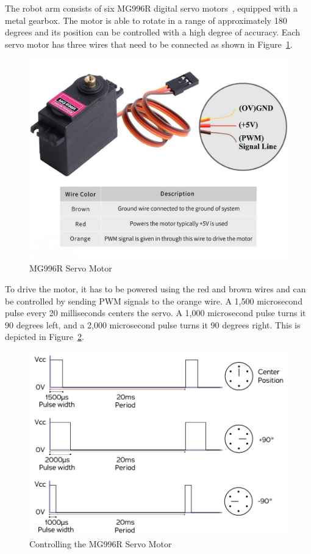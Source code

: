 \documentclass[MMR,Master,english]{style/twbook}
\begin{document}
\noindent The robot arm consists of six MG996R digital servo motors~\cite{MG996RServoMotor}, equipped with a metal gearbox. The motor is able to rotate in a range of approximately 180 degrees and its position can be controlled with a high degree of accuracy. Each servo motor has three wires that need to be connected as shown in Figure~\ref{fig:servo}.

\begin{figure}[H]
	\centering
	\includegraphics[width=0.7\columnwidth]{img/experiment/servo.jpg}
	\caption[MG996R Servo Motor]{MG996R Servo Motor~\cite{PackMg996rMetal}}
	\label{fig:servo}
\end{figure}

\noindent To drive the motor, it has to be powered using the red and brown wires and can be controlled by sending PWM signals to the orange wire. A 1,500 microsecond pulse every 20 milliseconds centers the servo. A 1,000 microsecond pulse turns it 90 degrees left, and a 2,000 microsecond pulse turns it 90 degrees right. This is depicted in Figure~\ref{fig:servo_angle}.

\begin{figure}[H]
	\centering
	\includegraphics[width=0.7\columnwidth]{img/experiment/servo_angle.png}
	\caption[Controlling the MG996R Servo Motor]{Controlling the MG996R Servo Motor~\cite{twierengEmilyQuadrupedDog}}
	\label{fig:servo_angle}
\end{figure}
\end{document}
